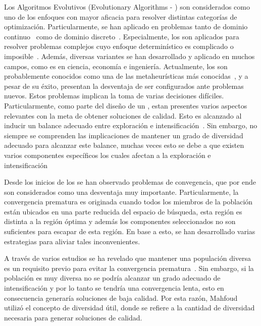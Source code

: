 Los Algoritmos Evolutivos (Evolutionary Algorithms - \EAS{}) son considerados como uno de los enfoques con mayor aficacia para resolver distintas categorías de optimización.
%
Particularmente, se han aplicado en problemas tanto de dominio continuo~\cite{glover2005handbook} como de dominio discreto~\cite{Joel:Dynamic_FAP}.
%
Especialmente, los \EAS{} son aplicados para resolver problemas complejos cuyo enfoque determinístico es complicado o imposible~\cite{chakraborty2008advances}.
% 
Además, diversas variantes se han desarrollado y aplicado en muchos campos, como es en ciencia, economía e ingeniería.
%
%
Actualmente, los \EAS{} son probablemente conocidos como una de las metaheurísticas más conocidas~\cite{glover2005handbook}, y a pesar de su éxito, presentan la desventaja de ser configurados ante problemas nuevos.
%
Estos problemas implican la toma de varias decisiones difíciles.
%
Particularmente, como parte del diseño de un \EA{}, estan presentes varios aspectos relevantes con la meta de obtener soluciones de calidad.
%
Esto es alcanzado al inducir un balance adecuado entre exploración e intensificación~\cite{herrera1996adaptation}.
%
Sin embargo, no siempre se comprenden las implicaciones de mantener un grado de diversidad adecuado para alcanzar este balance, muchas veces esto se debe a que existen varios componentes específicos los cuales afectan a la exploración e intensificación~\cite{Crepinsek:13}
%

Desde los inicios de los \EAS{} se han observado problemas de convegencia, que por ende son considerados como una desventaja muy importante\cite{Crepinsek:13}.
%
Particularmente, la convergencia prematura es originada cuando todos los miembros de la población están ubicados en una parte reducida del espacio de búsqueda, esta región es distinta a la región óptima y además los componentes seleccionados no son suficientes para escapar de esta región.
%
En base a esto, se han desarrollado varias estrategias para aliviar tales inconvenientes.
%


A través de varios estudios se ha revelado que mantener una populación diversa es un requisito previo para evitar la convergencia prematura~\cite{Crepinsek:13}.
%
Sin embargo, si la población es muy diversa no se podría alcanzar un grado adecuado de intensificación y por lo tanto se tendría una convergencia lenta, esto en consecuencia generaría soluciones de baja calidad.
%
Por esta razón, Mahfoud~\cite{dasgupta2013evolutionary} utilizó el concepto de diversidad útil, donde se refiere a la cantidad de diversidad necesaria para generar soluciones de calidad.
%

